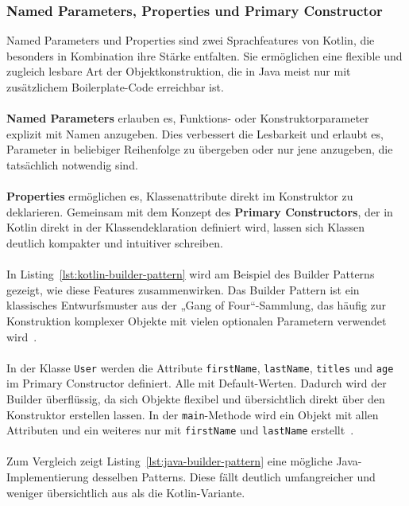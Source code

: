 \documentclass[11pt]{article}
\begin{document}
    \subsubsection{Named Parameters, Properties und Primary Constructor}
    Named Parameters und Properties sind zwei Sprachfeatures von Kotlin, die besonders in Kombination ihre Stärke entfalten.
    Sie ermöglichen eine flexible und zugleich lesbare Art der Objektkonstruktion, die in Java meist nur mit zusätzlichem Boilerplate-Code erreichbar ist.\\
    \\
    \textbf{Named Parameters} erlauben es, Funktions- oder Konstruktorparameter explizit mit Namen anzugeben.
    Dies verbessert die Lesbarkeit und erlaubt es, Parameter in beliebiger Reihenfolge zu übergeben oder nur jene anzugeben, die tatsächlich notwendig sind.\\
    \\
    \textbf{Properties} ermöglichen es, Klassenattribute direkt im Konstruktor zu deklarieren.
    Gemeinsam mit dem Konzept des \textbf{Primary Constructors}, der in Kotlin direkt in der Klassendeklaration definiert wird, lassen sich Klassen deutlich kompakter und intuitiver schreiben.\\
    \\
    In Listing~\ref{lst:kotlin-builder-pattern} wird am Beispiel des Builder Patterns gezeigt, wie diese Features zusammenwirken.
    Das Builder Pattern ist ein klassisches Entwurfsmuster aus der „Gang of Four“-Sammlung, das häufig zur Konstruktion komplexer Objekte mit vielen optionalen Parametern verwendet wird~\cite[139]{gang-of-four}.\\
    \\
    In der Klasse \texttt{User} werden die Attribute \texttt{firstName}, \texttt{lastName}, \texttt{titles} und \texttt{age} im Primary Constructor definiert.
    Alle mit Default-Werten.
    Dadurch wird der Builder überflüssig, da sich Objekte flexibel und übersichtlich direkt über den Konstruktor erstellen lassen.
    In der \texttt{main}-Methode wird ein Objekt mit allen Attributen und ein weiteres nur mit \texttt{firstName} und \texttt{lastName} erstellt~\cite[46]{kotlin-patterns}.\\
    \\
    Zum Vergleich zeigt Listing~\ref{lst:java-builder-pattern} eine mögliche Java-Implementierung desselben Patterns.
    Diese fällt deutlich umfangreicher und weniger übersichtlich aus als die Kotlin-Variante.\\
    \\
\end{document}
